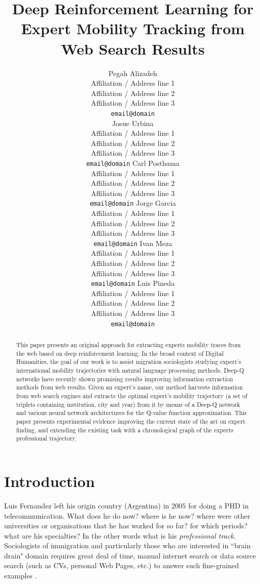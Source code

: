 \documentclass[11pt,a4paper]{article}
\title{Deep Reinforcement Learning for Expert Mobility Tracking from Web Search Results}
\author{Pegah Alizadeh \\
  Affiliation / Address line 1 \\
  Affiliation / Address line 2 \\
  Affiliation / Address line 3 \\
  {\tt email@domain} \\\And
  Josue Urbina \\
  Affiliation / Address line 1 \\
  Affiliation / Address line 2 \\
  Affiliation / Address line 3 \\
  {\tt email@domain}
  Carl Posthuma \\
  Affiliation / Address line 1 \\
  Affiliation / Address line 2 \\
  Affiliation / Address line 3 \\
  {\tt email@domain} 
  Jorge Garcia \\
  Affiliation / Address line 1 \\
  Affiliation / Address line 2 \\
  Affiliation / Address line 3 \\
  {\tt email@domain} 
  Ivan Meza \\
  Affiliation / Address line 1 \\
  Affiliation / Address line 2 \\
  Affiliation / Address line 3 \\
  {\tt email@domain} 
  Luis Pineda \\
  Affiliation / Address line 1 \\
  Affiliation / Address line 2 \\
  Affiliation / Address line 3 \\
  {\tt email@domain}
  \\}
\date{}
\begin{document}
\maketitle
\begin{abstract}

  This paper presents an original approach for extracting experts mobility traces from the web based on deep reinforcement learning. In the broad context of Digital Humanities, the goal of our work is to assist migration sociologists studying expert's international mobility trajectories with natural language processing methods. Deep-Q networks have recently shown promising results improving information extraction methods from web results. Given an expert's name, our method harvests information from web search engines and extracts the optimal expert's mobility trajectory (a set of triplets containing institution, city and year) from it by means of a Deep-Q network and various neural network architectures for the Q-value function approximation. This paper presents experimental evidence improving the current state of the art on expert finding, and extending the existing task with a chronological graph of the experts professional trajectory. 

\end{abstract}

\section{Introduction}
Luis Fernandez left his origin country (Argentina) in  $2005$ for doing a PHD in telecommunication. What does he do now? where is he now? where were other universities or organisations that he has worked for so far? for which periods? what are his specialties? In the other words what is his \textit{professional track}. Sociologists of immigration and particularly those who are interested in ``brain drain" domain requires great deal of time, manual internet search or data source search (such as CVs, personal Web Pages, etc.) to answer such fine-grained examples \cite{Auriol2010,Meyer2006}.
\end{document}
